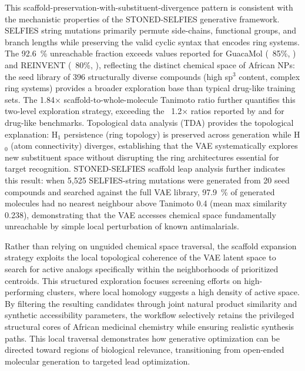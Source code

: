 \documentclass[journal=jcisd8,manuscript=article]{achemso}
\begin{document}
This scaffold-preservation-with-substituent-divergence pattern is consistent with the mechanistic properties of the STONED-SELFIES generative framework.
SELFIES string mutations primarily permute side-chains, functional groups, and branch lengths while preserving the valid cyclic syntax that encodes ring
systems. The \qty{92.6}{\percent} unreachable fraction exceeds values reported for GuacaMol (~85\%, \cite{Brown2019}) and REINVENT (~80\%,
\cite{gomez2018automatic}), reflecting the distinct chemical space of African NPs: the seed library of \num{396} structurally diverse compounds (high sp$^3$
content, complex ring systems) provides a broader exploration base than typical drug-like training sets. The \num{1.84}$\times$ scaffold-to-whole-molecule
Tanimoto ratio further quantifies this two-level exploration strategy, exceeding the ~\num{1.2}$\times$ ratios reported by \cite{Brown2019} and
\cite{Blaschke2020REINVENT2A} for drug-like benchmarks. Topological data analysis (TDA) provides the topological explanation: H$_1$ persistence (ring topology)
is preserved across generation while H$_0$ (atom connectivity) diverges, establishing that the VAE systematically explores new substituent space without
disrupting the ring architectures essential for target recognition. STONED-SELFIES scaffold leap analysis further indicates this result: when 5,525
SELFIES-string mutations were generated from 20 seed compounds and searched against the full VAE library, \qty{97.9}{\percent} of generated molecules had no
nearest neighbour above Tanimoto \num{0.4} (mean max similarity \num{0.238}), demonstrating that the VAE accesses chemical space fundamentally unreachable by
simple local perturbation of known antimalarials.

Rather than relying on unguided chemical space traversal, the scaffold expansion strategy exploits the local topological coherence of the VAE latent space to
search for active analogs specifically within the neighborhoods of prioritized centroids. This structured exploration focuses screening efforts on
high-performing clusters, where local homology suggests a high density of active space. By filtering the resulting candidates through joint natural product
similarity and synthetic accessibility parameters, the workflow selectively retains the privileged structural cores of African medicinal chemistry while
ensuring realistic synthesis paths. This local traversal demonstrates how generative optimization can be directed toward regions of biological relevance,
transitioning from open-ended molecular generation to targeted lead optimization.
\end{document}

